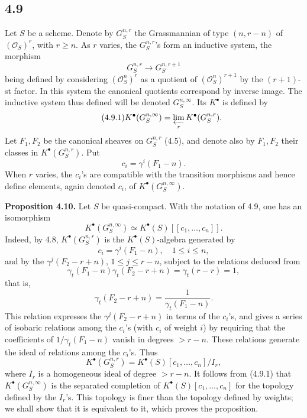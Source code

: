 \documentclass[11pt]{article}
\begin{document}
\subsection*{4.9}
Let \(S\) be a scheme. Denote by \(G_S^{n,r}\) the Grassmannian of type \((n,r-n)\) of \((\mathcal O_S)^r\), with \(r\geq n\). As \(r\) varies, the \(G_S^{n,r}\)'s form an inductive system, the morphism
\[
  G_S^{n,r}\longrightarrow G_S^{n,r+1}
\]
being defined by considering \((\mathcal O_S^n)^r\) as a quotient of \((\mathcal O_S^n)^{r+1}\) by the \((r+1)\)-st factor. In this system the canonical quotients correspond by inverse image. The inductive system thus defined will be denoted \(G_S^{n,\infty}\). Its \(K^\bullet\) is defined by
\begin{equation}\tag{4.9.1}
  K^\bullet(G_S^{n,\infty})=\varprojlim_r K^\bullet(G_S^{n,r}).
\end{equation}
Let \(F_1,F_2\) be the canonical sheaves on \(G_S^{n,r}\) (4.5), and denote also by \(F_1,F_2\) their classes in \(K^\bullet(G_S^{n,r})\). Put
\[
  c_i=\gamma^i(F_1-n).
\]
When \(r\) varies, the \(c_i\)'s are compatible with the transition morphisms and hence define elements, again denoted \(c_i\), of \(K^\bullet(G_S^{n,\infty})\).

\textbf{Proposition 4.10.} Let \(S\) be quasi-compact. With the notation of 4.9, one has an isomorphism
\[
  K^\bullet(G_S^{n,\infty})\simeq K^\bullet(S)[[c_1,\ldots,c_n]].
\]
Indeed, by 4.8, \(K^\bullet(G_S^{n,r})\) is the \(K^\bullet(S)\)-algebra generated by
\[
  c_i=\gamma^i(F_1-n),\quad 1\leq i\leq n,
\]
and by the \(\gamma^j(F_2-r+n)\), \(1\leq j\leq r-n\), subject to the relations deduced from
\[
  \gamma_t(F_1-n)\gamma_t(F_2-r+n)=\gamma_t(r-r)=1,
\]
that is,
\[
  \gamma_t(F_2-r+n)=\frac{1}{\gamma_t(F_1-n)}.
\]
This relation expresses the \(\gamma^j(F_2-r+n)\) in terms of the \(c_i\)'s, and gives a series of isobaric relations among the \(c_i\)'s (with \(c_i\) of weight \(i\)) by requiring that the coefficients of \(1/\gamma_t(F_1-n)\) vanish in degrees \(>r-n\). These relations generate the ideal of relations among the \(c_i\)'s. Thus
\[
  K^\bullet(G_S^{n,r})=K^\bullet(S)[c_1,\ldots,c_n]/I_r,
\]
where \(I_r\) is a homogeneous ideal of degree \(>r-n\). It follows from (4.9.1) that \(K^\bullet(G_S^{n,\infty})\) is the separated completion of \(K^\bullet(S)[c_1,\ldots,c_n]\) for the topology defined by the \(I_r\)'s. This topology is finer than the topology defined by weights; we shall show that it is equivalent to it, which proves the proposition.
\end{document}
